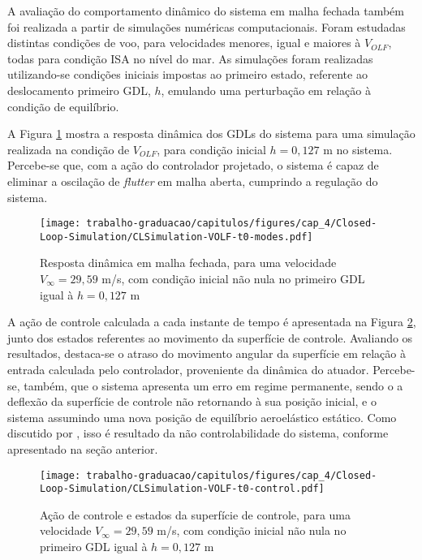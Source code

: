 A avaliação do comportamento dinâmico do sistema em malha fechada também foi realizada a partir de simulações numéricas computacionais. Foram estudadas distintas condições de voo, para velocidades menores, igual e maiores à $V_{OLF}$, todas para condição ISA no nível do mar. As simulações foram realizadas utilizando-se condições iniciais impostas ao primeiro estado, referente ao deslocamento primeiro \gls{GDL}, $h$, emulando uma perturbação em relação à condição de equilíbrio.

\newpage

A Figura \ref{fig:CloseLoopResponse-t0-VOLF} mostra a resposta dinâmica dos \gls{GDL}s do sistema para uma simulação realizada na condição de $V_{OLF}$, para condição inicial $h = 0,127$ m no sistema. Percebe-se que, com a ação do controlador projetado, o sistema é capaz de eliminar a oscilação de \textit{flutter} em malha aberta, cumprindo a regulação do sistema. 

\begin{figure}[ht!]
    \centering
    \caption{Resposta dinâmica em malha fechada, para uma velocidade $V_{\infty} = 29,59$ m/s, com condição inicial não nula no primeiro \gls{GDL} igual à $h=0,127$ m}
    \noindent\texttt{[image: trabalho-graduacao/capitulos/figures/cap\_4/Closed-Loop-Simulation/CLSimulation-VOLF-t0-modes.pdf]}
    \label{fig:CloseLoopResponse-t0-VOLF}
\end{figure}


A ação de controle calculada a cada instante de tempo é apresentada na Figura \ref{fig:CloseLoopControl-t0-VOLF}, junto dos estados referentes ao movimento da superfície de controle. Avaliando os resultados, destaca-se o atraso do movimento angular da superfície em relação à entrada calculada pelo controlador, proveniente da dinâmica do atuador. Percebe-se, também, que o sistema apresenta um erro em regime permanente, sendo o a deflexão da superfície de controle não retornando à sua posição inicial, e o sistema assumindo uma nova posição de equilíbrio aeroelástico estático. Como discutido por \textcite{art:Sun-2014}, isso é resultado da não controlabilidade do sistema, conforme apresentado na seção anterior.


\begin{figure}[ht!]
    \centering
    \caption{Ação de controle e estados da superfície de controle, para uma velocidade $V_{\infty} = 29,59$ m/s, com condição inicial não nula no primeiro \gls{GDL} igual à $h=0,127$ m}
    \noindent\texttt{[image: trabalho-graduacao/capitulos/figures/cap\_4/Closed-Loop-Simulation/CLSimulation-VOLF-t0-control.pdf]}
    \label{fig:CloseLoopControl-t0-VOLF}
\end{figure}

